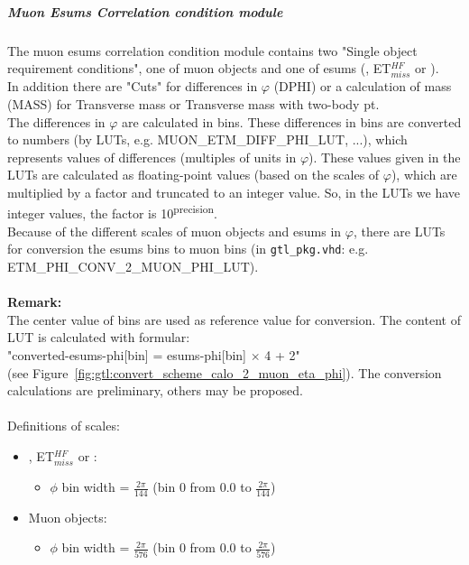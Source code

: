 \subparagraph{Muon Esums Correlation condition module}
\label{sec:gtl:muon_esums_correlation_condition_module}

The muon esums correlation condition module contains two "Single object requirement conditions", one of muon objects and one of esums (\etm, ET$_{miss}^{HF}$ or \htm).\\
In addition there are "Cuts" for differences in $\varphi$ (DPHI) or a calculation of mass (MASS) for Transverse mass or Transverse mass with two-body pt.\\
The differences in $\varphi$ are calculated in bins. These differences in bins are converted to numbers (by LUTs, e.g. \small{MUON\_ETM\_DIFF\_PHI\_LUT}\normalsize, ...),
which represents values of differences (multiples of units in $\varphi$).
These values given in the LUTs are calculated as floating-point values (based on the scales of $\varphi$), which are multiplied by a factor and truncated to an integer value.
So, in the LUTs we have integer values, the factor is 10\textsuperscript{\tiny{precision}\normalsize}.\\
Because of the different scales of muon objects and esums in $\varphi$, there are LUTs for conversion the esums bins to muon bins (in \texttt{gtl\_pkg.vhd}:
 e.g. \small{ETM\_PHI\_CONV\_2\_MUON\_PHI\_LUT}\normalsize).\\\\
\textbf{Remark:}\\
The center value of bins are used as reference value for conversion.
The content of LUT is calculated with formular:\\
"converted-esums-phi[bin] = esums-phi[bin] $\times$ 4 + 2"\\ (see Figure~\ref{fig:gtl:convert_scheme_calo_2_muon_eta_phi}).
The conversion calculations are preliminary, others may be proposed.\\\\
Definitions of scales:
\begin{itemize}
\item \etm, ET$_{miss}^{HF}$ or \htm:
\begin{itemize}
\item $\phi$ bin width = $\frac{2\pi}{144}$ (bin 0 from 0.0 to $\frac{2\pi}{144}$)
\end{itemize}
\item Muon objects:
\begin{itemize}
\item $\phi$ bin width = $\frac{2\pi}{576}$ (bin 0 from 0.0 to $\frac{2\pi}{576}$)
\end{itemize}
\end{itemize}

